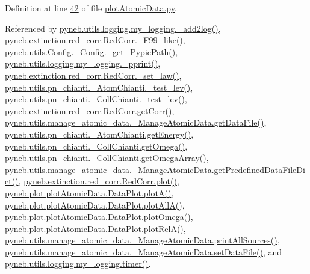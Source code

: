 Definition at line \hyperlink{plot_atomic_data_8py_source_l00042}{42} of file \hyperlink{plot_atomic_data_8py_source}{plot\-Atomic\-Data.\-py}.



Referenced by \hyperlink{logging_8py_source_l00059}{pyneb.\-utils.\-logging.\-my\-\_\-logging.\-\_\-add2log()}, \hyperlink{red__corr_8py_source_l00658}{pyneb.\-extinction.\-red\-\_\-corr.\-Red\-Corr.\-\_\-\-F99\-\_\-like()}, \hyperlink{_config_8py_source_l00115}{pyneb.\-utils.\-Config.\-\_\-\-Config.\-\_\-get\-\_\-\-Pypic\-Path()}, \hyperlink{logging_8py_source_l00051}{pyneb.\-utils.\-logging.\-my\-\_\-logging.\-\_\-pprint()}, \hyperlink{red__corr_8py_source_l00176}{pyneb.\-extinction.\-red\-\_\-corr.\-Red\-Corr.\-\_\-set\-\_\-law()}, \hyperlink{pn__chianti_8py_source_l00304}{pyneb.\-utils.\-pn\-\_\-chianti.\-\_\-\-Atom\-Chianti.\-\_\-test\-\_\-lev()}, \hyperlink{pn__chianti_8py_source_l00472}{pyneb.\-utils.\-pn\-\_\-chianti.\-\_\-\-Coll\-Chianti.\-\_\-test\-\_\-lev()}, \hyperlink{red__corr_8py_source_l00211}{pyneb.\-extinction.\-red\-\_\-corr.\-Red\-Corr.\-get\-Corr()}, \hyperlink{manage__atomic__data_8py_source_l00297}{pyneb.\-utils.\-manage\-\_\-atomic\-\_\-data.\-\_\-\-Manage\-Atomic\-Data.\-get\-Data\-File()}, \hyperlink{pn__chianti_8py_source_l00366}{pyneb.\-utils.\-pn\-\_\-chianti.\-\_\-\-Atom\-Chianti.\-get\-Energy()}, \hyperlink{pn__chianti_8py_source_l00507}{pyneb.\-utils.\-pn\-\_\-chianti.\-\_\-\-Coll\-Chianti.\-get\-Omega()}, \hyperlink{pn__chianti_8py_source_l00484}{pyneb.\-utils.\-pn\-\_\-chianti.\-\_\-\-Coll\-Chianti.\-get\-Omega\-Array()}, \hyperlink{manage__atomic__data_8py_source_l00034}{pyneb.\-utils.\-manage\-\_\-atomic\-\_\-data.\-\_\-\-Manage\-Atomic\-Data.\-get\-Predefined\-Data\-File\-Dict()}, \hyperlink{red__corr_8py_source_l00303}{pyneb.\-extinction.\-red\-\_\-corr.\-Red\-Corr.\-plot()}, \hyperlink{plot_atomic_data_8py_source_l00117}{pyneb.\-plot.\-plot\-Atomic\-Data.\-Data\-Plot.\-plot\-A()}, \hyperlink{plot_atomic_data_8py_source_l00189}{pyneb.\-plot.\-plot\-Atomic\-Data.\-Data\-Plot.\-plot\-All\-A()}, \hyperlink{plot_atomic_data_8py_source_l00373}{pyneb.\-plot.\-plot\-Atomic\-Data.\-Data\-Plot.\-plot\-Omega()}, \hyperlink{plot_atomic_data_8py_source_l00262}{pyneb.\-plot.\-plot\-Atomic\-Data.\-Data\-Plot.\-plot\-Rel\-A()}, \hyperlink{manage__atomic__data_8py_source_l00431}{pyneb.\-utils.\-manage\-\_\-atomic\-\_\-data.\-\_\-\-Manage\-Atomic\-Data.\-print\-All\-Sources()}, \hyperlink{manage__atomic__data_8py_source_l00380}{pyneb.\-utils.\-manage\-\_\-atomic\-\_\-data.\-\_\-\-Manage\-Atomic\-Data.\-set\-Data\-File()}, and \hyperlink{logging_8py_source_l00115}{pyneb.\-utils.\-logging.\-my\-\_\-logging.\-timer()}.

